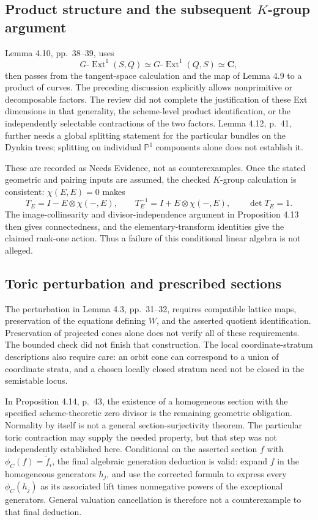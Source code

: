 \documentclass[10pt]{article}
\begin{document}
\subsection*{Product structure and the subsequent \(K\)-group argument}
Lemma 4.10, pp. 38–39, uses \[G\text{-}\operatorname{Ext}^1(S,Q)
 \simeq G\text{-}\operatorname{Ext}^1(Q,S)\simeq\mathbf C,\] then passes from the tangent-space calculation and the map of Lemma 4.9 to a product of curves. The preceding discussion explicitly allows nonprimitive or decomposable factors. The review did not complete the justification of these Ext dimensions in that generality, the scheme-level product identification, or the independently selectable contractions of the two factors. Lemma 4.12, p. 41, further needs a global splitting statement for the particular bundles on the Dynkin trees; splitting on individual \(\mathbb P^1\) components alone does not establish it.\par
These are recorded as Needs Evidence, not as counterexamples. Once the stated geometric and pairing inputs are assumed, the checked \(K\)-group calculation is consistent: \(\chi(E,E)=0\) makes \[T_E=I-E\otimes\chi(-,E),\qquad
 T_E^{-1}=I+E\otimes\chi(-,E),\qquad \det T_E=1.\] The image-collinearity and divisor-independence argument in Proposition 4.13 then gives connectedness, and the elementary-transform identities give the claimed rank-one action. Thus a failure of this conditional linear algebra is not alleged.\par
\subsection*{Toric perturbation and prescribed sections}
The perturbation in Lemma 4.3, pp. 31–32, requires compatible lattice maps, preservation of the equations defining \(W\), and the asserted quotient identification. Preservation of projected cones alone does not verify all of these requirements. The bounded check did not finish that construction. The local coordinate-stratum descriptions also require care: an orbit cone can correspond to a union of coordinate strata, and a chosen locally closed stratum need not be closed in the semistable locus.\par
In Proposition 4.14, p. 43, the existence of a homogeneous section with the specified scheme-theoretic zero divisor is the remaining geometric obligation. Normality by itself is not a general section-surjectivity theorem. The particular toric contraction may supply the needed property, but that step was not independently established here. Conditional on the asserted section \(f\) with \(\phi_C(f)=\widetilde f_i\), the final algebraic generation deduction is valid: expand \(f\) in the homogeneous generators \(h_j\), and use the corrected formula to express every \(\phi_C(h_j)\) as its associated lift times nonnegative powers of the exceptional generators. General valuation cancellation is therefore not a counterexample to that final deduction.\par
\end{document}
